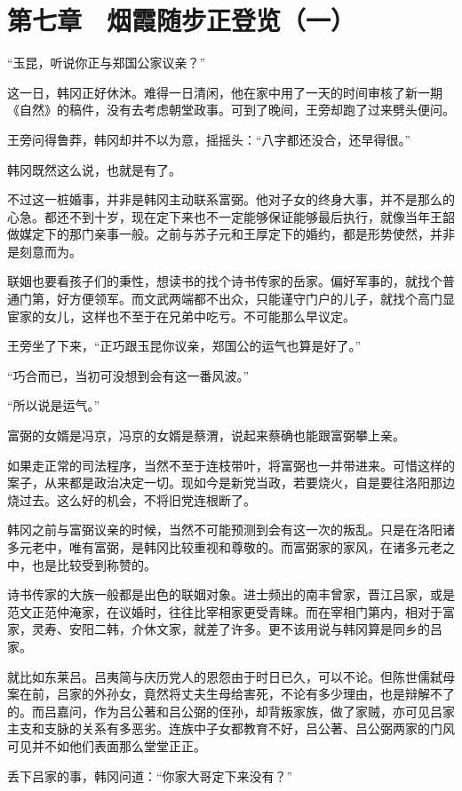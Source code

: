 \section{第七章　烟霞随步正登览（一）}

“玉昆，听说你正与郑国公家议亲？”

这一日，韩冈正好休沐。难得一日清闲，他在家中用了一天的时间审核了新一期《自然》的稿件，没有去考虑朝堂政事。可到了晚间，王旁却跑了过来劈头便问。

王旁问得鲁莽，韩冈却并不以为意，摇摇头：“八字都还没合，还早得很。”

韩冈既然这么说，也就是有了。

不过这一桩婚事，并非是韩冈主动联系富弼。他对子女的终身大事，并不是那么的心急。都还不到十岁，现在定下来也不一定能够保证能够最后执行，就像当年王韶做媒定下的那门亲事一般。之前与苏子元和王厚定下的婚约，都是形势使然，并非是刻意而为。

联姻也要看孩子们的秉性，想读书的找个诗书传家的岳家。偏好军事的，就找个普通门第，好方便领军。而文武两端都不出众，只能谨守门户的儿子，就找个高门显宦家的女儿，这样也不至于在兄弟中吃亏。不可能那么早议定。

王旁坐了下来，“正巧跟玉昆你议亲，郑国公的运气也算是好了。”

“巧合而已，当初可没想到会有这一番风波。”

“所以说是运气。”

富弼的女婿是冯京，冯京的女婿是蔡渭，说起来蔡确也能跟富弼攀上亲。

如果走正常的司法程序，当然不至于连枝带叶，将富弼也一并带进来。可惜这样的案子，从来都是政治决定一切。现如今是新党当政，若要烧火，自是要往洛阳那边烧过去。这么好的机会，不将旧党连根断了。

韩冈之前与富弼议亲的时候，当然不可能预测到会有这一次的叛乱。只是在洛阳诸多元老中，唯有富弼，是韩冈比较重视和尊敬的。而富弼家的家风，在诸多元老之中，也是比较受到称赞的。

诗书传家的大族一般都是出色的联姻对象。进士频出的南丰曾家，晋江吕家，或是范文正范仲淹家，在议婚时，往往比宰相家更受青睐。而在宰相门第内，相对于富家，灵寿、安阳二韩，介休文家，就差了许多。更不该用说与韩冈算是同乡的吕家。

就比如东莱吕。吕夷简与庆历党人的恩怨由于时日已久，可以不论。但陈世儒弑母案在前，吕家的外孙女，竟然将丈夫生母给害死，不论有多少理由，也是辩解不了的。而吕嘉问，作为吕公著和吕公弼的侄孙，却背叛家族，做了家贼，亦可见吕家主支和支脉的关系有多恶劣。连族中子女都教育不好，吕公著、吕公弼两家的门风可见并不如他们表面那么堂堂正正。

丢下吕家的事，韩冈问道：“你家大哥定下来没有？”

